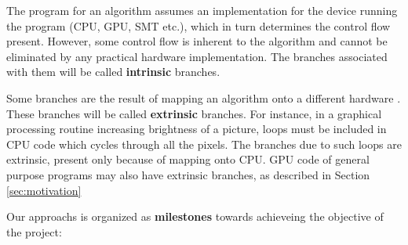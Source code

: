 
\par{
The program for an algorithm assumes an implementation for the device running the program (CPU, GPU, SMT etc.), which in turn determines the control flow present. However, some control flow is inherent to the algorithm and cannot be eliminated by any practical hardware implementation. The branches associated with them will be called \textbf{intrinsic} branches.
}

\par{
Some branches are the result of mapping an algorithm onto a different hardware . These branches will be called \textbf{extrinsic} branches. For instance, in a graphical processing routine increasing brightness of a picture, loops must be included in CPU code which cycles through all the pixels. The branches due to such loops are extrinsic, present only because of mapping onto CPU. GPU code of general purpose programs may also have extrinsic branches, as described in Section \ref{sec:motivation}  
} 

\par{Our approachs is organized as \textbf{milestones} towards achieveing the objective of the project:}

